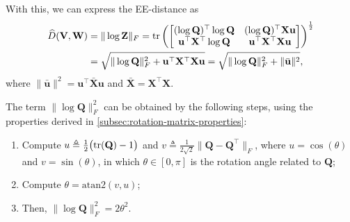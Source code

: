 With this, we can express the EE-distance as
\begin{align}
    \begin{split}
    \widehat{D}(\mathbf{V}, \mathbf{W}) &= \|\log\mathbf{Z}\|_F = \operatorname{tr}\left(
        \begin{bmatrix}
            (\log\mathbf{Q})^\top\log\mathbf{Q} & (\log\mathbf{Q})^\top\mathbf{X}\mathbf{u}\\
            \mathbf{u}^\top\mathbf{X}^\top\log\mathbf{Q} & \mathbf{u}^\top\mathbf{X}^\top\mathbf{X}\mathbf{u}
        \end{bmatrix}
    \right)^\frac{1}{2}\\
        &= \sqrt{\|\log\mathbf{Q}\|_F^2 + \mathbf{u}^\top\mathbf{X}^\top\mathbf{X}\mathbf{u}} = \sqrt{\|\log\mathbf{Q}\|_F^2 + \|\bar{\mathbf{u}}\|^2},
    \end{split}
\end{align}
where $\|\bar{\mathbf{u}}\|^2 = \mathbf{u}^\top\bar{\mathbf{X}}\mathbf{u}$ and $\bar{\mathbf{X}}=\mathbf{X}^\top\mathbf{X}$.

The term $\|\log\mathbf{Q}\|_F^2$ can be obtained by the following steps, using the properties derived in \cref{subsec:rotation-matrix-properties}:
\begin{enumerate}
    \item Compute $u \triangleq \frac{1}{2}\bigl(\operatorname{tr}(\mathbf{Q})-1\bigr)$ and $v \triangleq \frac{1}{2\sqrt{2}}\|\mathbf{Q}{-}\mathbf{Q}^{\top}\|_F$, where $u = \cos(\theta)$ and $v=\sin(\theta)$, in which $\theta \in [0, \pi]$ is the rotation angle related to $\mathbf{Q}$;
    \item Compute $\theta = \text{atan2}(v,u)$;
    \item Then, $\|\log\mathbf{Q}\|_F^2 = 2\theta^2$.
\end{enumerate}

